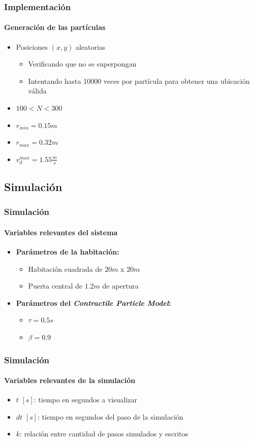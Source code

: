 \documentclass[hyperref={pdfpagelayout=SinglePage}]{beamer}
\begin{document}
\begin{frame}
\frametitle{Implementación}
\framesubtitle{Generación de las partículas}
\begin{itemize}
	\item Posiciones $(x,y)$ aleatorias
	\begin{itemize}
		\item Verificando que no se superpongan
		\item Intentando hasta 10000 veces por partícula para obtener una ubicación válida 
	\end{itemize}
	\item $100 < N < 300$
	\item $r_{min} = 0.15m$
	\item $r_{max} = 0.32m$
	\item $v_{d}^{max} = 1.55 \frac{m}{s}$
\end{itemize}
\end{frame}

\subsection{Simulación}

\begin{frame}
\frametitle{Simulación}
\framesubtitle{Variables relevantes del sistema}
\begin{itemize}
	\item \textbf{Parámetros de la habitación:}
	\begin{itemize}
		\item Habitación cuadrada de $20m$ x $20m$
		\item Puerta central de $1.2m$ de apertura
	\end{itemize}
	\item \textbf{Parámetros del \textit{Contractile Particle Model}:}
	\begin{itemize}
		\item $\tau = 0.5s$
		\item $\beta = 0.9$
	\end{itemize}
\end{itemize}
\end{frame}

\begin{frame}
\frametitle{Simulación}
\framesubtitle{Variables relevantes de la simulación}
\begin{itemize}
	\item $t$ $[s]$: tiempo en segundos a visualizar
	\item $dt$ $[s]$: tiempo en segundos del paso de la simulación
	\item $k$: relación entre cantidad de pasos simulados y escritos
\end{itemize}
\end{frame}
\end{document}
